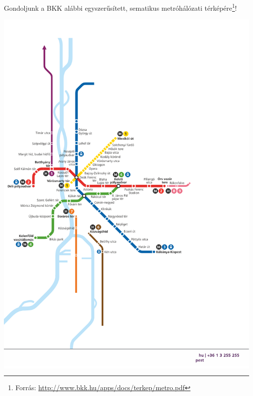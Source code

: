 \begin{pelda}
	Gondoljunk a BKK alábbi egyszerűsített, sematikus metróhálózati térképére\footnote{Forrás: \url{http://www.bkk.hu/apps/docs/terkep/metro.pdf}}!
	\begin{center}
		\colorbox{white}{
			\includegraphics[scale=0.7]{modellek-ellenorzese/figures/metrohev-terkep-reszlet}
		}
	\end{center}
	

\end{pelda}
